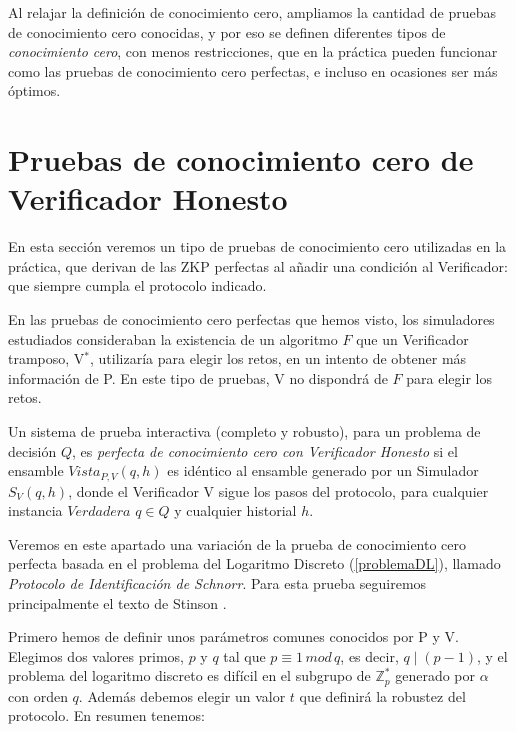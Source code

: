 Al relajar la definición de conocimiento cero, ampliamos la cantidad de pruebas de conocimiento cero conocidas, y por eso se definen diferentes tipos de \textit{conocimiento cero}, con menos restricciones, que en la práctica pueden funcionar como las pruebas de conocimiento cero perfectas, e incluso en ocasiones ser más óptimos.



\hfil


\section{Pruebas de conocimiento cero de Verificador Honesto}\label{honestVer:sec}



En esta sección veremos un tipo de pruebas de conocimiento cero utilizadas en la práctica, que derivan de las ZKP perfectas al añadir una condición al Verificador: que siempre cumpla el protocolo indicado.

En las pruebas de conocimiento cero perfectas que hemos visto, los simuladores estudiados consideraban la existencia de un algoritmo $F$ que un Verificador tramposo, V$^*$, utilizaría para elegir los retos, en un intento de obtener más información de P. En este tipo de pruebas, V no dispondrá de $F$ para elegir los retos.


\begin{definition}
	\hfil
	
	Un sistema de prueba interactiva (completo y robusto), para un problema de decisión $Q$, es \textit{perfecta de conocimiento cero con Verificador Honesto} si el ensamble $Vista_{P,V}(q,h)$ es idéntico al ensamble generado por un Simulador $S_{V}(q,h)$, donde el Verificador V sigue los pasos del protocolo, para cualquier instancia $Verdadera$ $q\in Q$ y cualquier historial $h$.
\end{definition}

\hfil

Veremos en este apartado una variación de la prueba de conocimiento cero perfecta basada en el problema del Logaritmo Discreto (\ref{problemaDL}), llamado \textit{Protocolo de Identificación de Schnorr}. Para esta prueba seguiremos principalmente el texto de Stinson \citep[Section 9.4]{stinson2005cryptography}.

Primero hemos de definir unos parámetros comunes conocidos por P y V. Elegimos dos valores primos, $p$ y $q$ tal que $p\equiv 1 \, mod \, q$, es decir, $q\mid (p-1)$, y el problema del logaritmo discreto es difícil en el subgrupo de $\mathbb{Z}_p^*$ generado por $\alpha$ con orden $q$. Además debemos elegir un valor $t$ que definirá la robustez del protocolo. En resumen tenemos:

